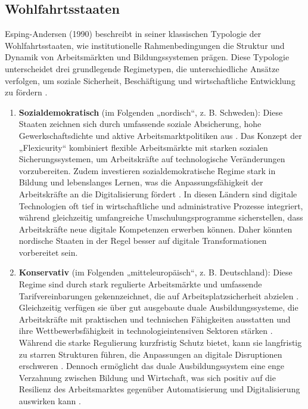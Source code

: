 \subsection{Wohlfahrtsstaaten} 

Esping-Andersen (1990) beschreibt in seiner klassischen Typologie der Wohlfahrtsstaaten, 
wie institutionelle Rahmenbedingungen die Struktur und Dynamik von Arbeitsmärkten und 
Bildungssystemen prägen. Diese Typologie unterscheidet drei grundlegende Regimetypen, die 
unterschiedliche Ansätze verfolgen, um soziale Sicherheit, Beschäftigung und 
wirtschaftliche Entwicklung zu fördern \parencite[vgl.][S. 27–28]{espingandersen1990thethree}.

\begin{enumerate}

    \item \textbf{Sozialdemokratisch} (im Folgenden „nordisch“, z. B. Schweden): Diese 
    Staaten zeichnen sich durch umfassende soziale Absicherung, hohe Gewerkschaftsdichte 
    und aktive Arbeitsmarktpolitiken aus \parencite[vgl.][S. 26]{espingandersen1990thethree}. 
    Das Konzept der „Flexicurity“ kombiniert flexible Arbeitsmärkte mit starken sozialen 
    Sicherungssystemen, um Arbeitskräfte auf technologische Veränderungen vorzubereiten. 
    Zudem investieren sozialdemokratische Regime stark in Bildung und lebenslanges Lernen, 
    was die Anpassungsfähigkeit der Arbeitskräfte an die Digitalisierung fördert 
    \parencite[vgl.][S. 56]{espingandersen1990thethree}. In diesen Ländern sind digitale 
    Technologien oft tief in wirtschaftliche und administrative Prozesse integriert, während 
    gleichzeitig umfangreiche Umschulungsprogramme sicherstellen, dass Arbeitskräfte neue 
    digitale Kompetenzen erwerben können. Daher könnten nordische Staaten in der Regel 
    besser auf digitale Transformationen vorbereitet sein.

    \item \textbf{Konservativ} (im Folgenden „mitteleuropäisch“, z. B. Deutschland): Diese 
    Regime sind durch stark regulierte Arbeitsmärkte und umfassende Tarifvereinbarungen 
    gekennzeichnet, die auf Arbeitsplatzsicherheit abzielen 
    \parencite[vgl.][S. 27]{espingandersen1990thethree}. Gleichzeitig verfügen sie über 
    gut ausgebaute duale Ausbildungssysteme, die Arbeitskräfte mit praktischen und 
    technischen Fähigkeiten ausstatten und ihre Wettbewerbsfähigkeit in technologieintensiven 
    Sektoren stärken \parencite[vgl.][S. 78]{hall2001varieties}. Während die starke 
    Regulierung kurzfristig Schutz bietet, kann sie langfristig zu starren Strukturen 
    führen, die Anpassungen an digitale Disruptionen erschweren 
    \parencite[vgl.][S. 20–21]{hall2001varieties}. Dennoch ermöglicht das duale 
    Ausbildungssystem eine enge Verzahnung zwischen Bildung und Wirtschaft, was sich 
    positiv auf die Resilienz des Arbeitsmarktes gegenüber Automatisierung und 
    Digitalisierung auswirken kann \parencite[vgl.][S. 25–27]{hall2001varieties}.


\end{enumerate}
